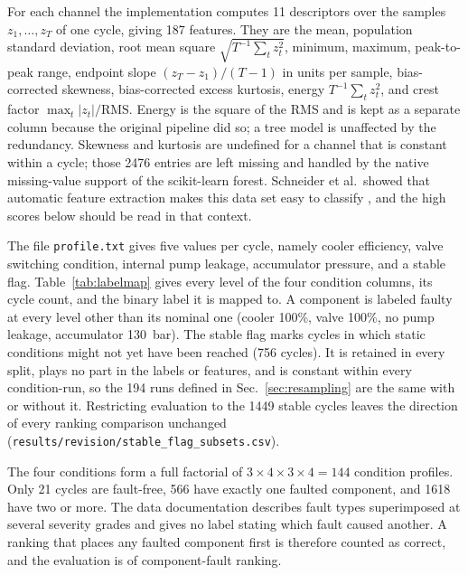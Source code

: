 \documentclass[journal]{IEEEtran}
\begin{document}


For each channel the implementation computes 11 descriptors over the samples
$z_1,\dots,z_T$ of one cycle, giving 187 features. They are the mean, population standard
deviation, root mean square $\sqrt{T^{-1}\sum_t z_t^2}$, minimum, maximum,
peak-to-peak range, endpoint slope $(z_T-z_1)/(T-1)$ in units per sample,
bias-corrected skewness, bias-corrected excess kurtosis, energy
$T^{-1}\sum_t z_t^2$, and crest factor $\max_t|z_t|/\mathrm{RMS}$. Energy is the
square of the RMS and is kept as a separate column because the original pipeline
did so; a tree model is unaffected by the redundancy. Skewness and kurtosis are
undefined for a channel that is constant within a cycle; those 2476 entries are
left missing and handled by the native missing-value support of the scikit-learn
forest. Schneider et al.\ showed that automatic feature extraction makes this data
set easy to classify \cite{Schneider2017FeatureExtraction}, and the high scores
below should be read in that context.

The file \texttt{profile.txt} gives five values per cycle, namely cooler efficiency,
valve switching condition, internal pump leakage, accumulator pressure, and a
stable flag. Table~\ref{tab:labelmap} gives every level of the four condition
columns, its cycle count, and the binary label it is mapped to. A component is
labeled faulty at every level other than its nominal one (cooler 100\%, valve
100\%, no pump leakage, accumulator 130~bar). The stable flag marks cycles in which
static conditions might not yet have been reached (756 cycles). It is retained in
every split, plays no part in the labels or features, and is constant within every
condition-run, so the 194 runs defined in Sec.~\ref{sec:resampling} are the same
with or without it. Restricting evaluation to the 1449 stable cycles leaves the
direction of every ranking comparison unchanged
(\texttt{results/revision/stable\_flag\_subsets.csv}).



The four conditions form a full factorial of $3\times4\times3\times4=144$ condition
profiles. Only 21 cycles are fault-free, 566 have exactly one faulted component,
and 1618 have two or more. The data documentation describes fault types
superimposed at several severity grades and gives no label stating which fault
caused another. A ranking that places any faulted component first is therefore
counted as correct, and the evaluation is of component-fault ranking.
\end{document}
